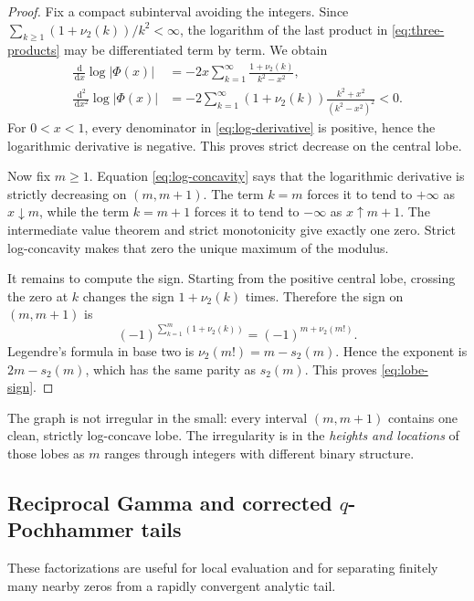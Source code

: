 \documentclass[11pt,oneside]{article}
\numberwithin{equation}{section}
\theoremstyle{definition}
\theoremstyle{remark}
\newcommand{\dd}{\,\mathrm d}
\newcommand{\abs}[1]{\left|#1\right|}
\newcommand{\PhiUp}{\Phi}
\newcommand{\digitsum}{s_2}
\newcommand{\nuTwo}{\nu_2}
\begin{document}
\begin{proof}
Fix a compact subinterval avoiding the integers.  Since
\(\sum_{k\ge1}(1+\nuTwo(k))/k^2<\infty\), the logarithm of the last product in
\eqref{eq:three-products} may be differentiated term by term.  We obtain
\begin{align}
 \frac{\dd}{\dd x}\log\abs{\PhiUp(x)}
 &=-2x\sum_{k=1}^{\infty}\frac{1+\nuTwo(k)}{k^2-x^2},
 \label{eq:log-derivative}\\
 \frac{\dd^2}{\dd x^2}\log\abs{\PhiUp(x)}
 &=-2\sum_{k=1}^{\infty}(1+\nuTwo(k))
   \frac{k^2+x^2}{(k^2-x^2)^2}<0.
 \label{eq:log-concavity}
\end{align}
For \(0<x<1\), every denominator in \eqref{eq:log-derivative} is positive, hence the
logarithmic derivative is negative.  This proves strict decrease on the central lobe.

Now fix \(m\ge1\).  Equation \eqref{eq:log-concavity} says that the logarithmic derivative
is strictly decreasing on \((m,m+1)\).  The term \(k=m\) forces it to tend to \(+\infty\)
as \(x\downarrow m\), while the term \(k=m+1\) forces it to tend to \(-\infty\) as
\(x\uparrow m+1\).  The intermediate value theorem and strict monotonicity give exactly one
zero.  Strict log-concavity makes that zero the unique maximum of the modulus.

It remains to compute the sign.  Starting from the positive central lobe, crossing the zero
at \(k\) changes the sign \(1+\nuTwo(k)\) times.  Therefore the sign on \((m,m+1)\) is
\[
 (-1)^{\sum_{k=1}^{m}(1+\nuTwo(k))}
 =(-1)^{m+\nuTwo(m!)}.
\]
Legendre's formula in base two is \(\nuTwo(m!)=m-\digitsum(m)\).  Hence the exponent is
\(2m-\digitsum(m)\), which has the same parity as \(\digitsum(m)\).  This proves
\eqref{eq:lobe-sign}.
\end{proof}

\begin{meaningbox}
The graph is not irregular in the small: every interval \((m,m+1)\) contains one clean,
strictly log-concave lobe.  The irregularity is in the \emph{heights and locations} of those
lobes as \(m\) ranges through integers with different binary structure.
\end{meaningbox}

\subsection{Reciprocal Gamma and corrected \texorpdfstring{\(q\)}{q}-Pochhammer tails}

These factorizations are useful for local evaluation and for separating finitely many nearby
zeros from a rapidly convergent analytic tail.
\end{document}
